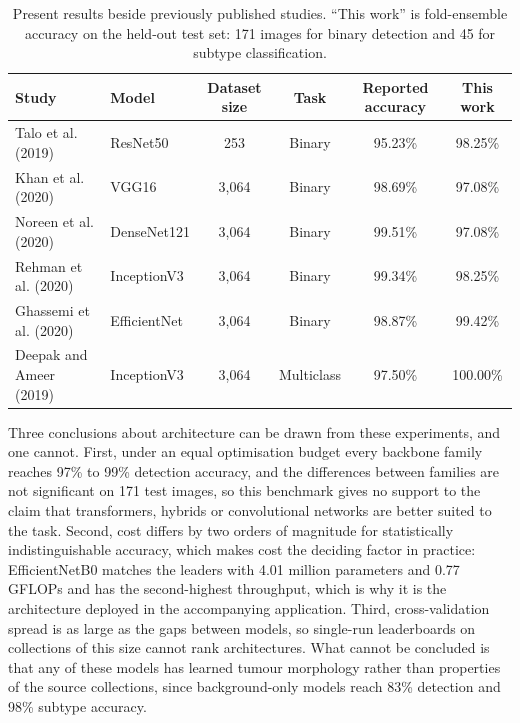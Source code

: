 \documentclass[final,3p,times,number]{elsarticle}
\begin{document}
\begin{table}[htbp]
\centering
\caption{Present results beside previously published studies. ``This work'' is fold-ensemble accuracy on the held-out test set: 171 images for binary detection and 45 for subtype classification.}
\label{tab:literature-comparison}
\small
\begin{tabular*}{\textwidth}{@{\extracolsep{\fill}}llcccc@{}}
\toprule
Study & Model & Dataset size & Task & Reported accuracy & This work \\
\midrule
Talo et al. (2019) \cite{ref16} & ResNet50 & 253 & Binary & 95.23\% & 98.25\% \\
Khan et al. (2020) \cite{ref23} & VGG16 & 3,064 & Binary & 98.69\% & 97.08\% \\
Noreen et al. (2020) \cite{ref24} & DenseNet121 & 3,064 & Binary & 99.51\% & 97.08\% \\
Rehman et al. (2020) \cite{ref25} & InceptionV3 & 3,064 & Binary & 99.34\% & 98.25\% \\
Ghassemi et al. (2020) \cite{ref26} & EfficientNet & 3,064 & Binary & 98.87\% & 99.42\% \\
Deepak and Ameer (2019) \cite{ref15} & InceptionV3 & 3,064 & Multiclass & 97.50\% & 100.00\% \\
\bottomrule
\end{tabular*}
\end{table}

Three conclusions about architecture can be drawn from these experiments, and one cannot. First, under an equal optimisation budget every backbone family reaches 97\% to 99\% detection accuracy, and the differences between families are not significant on 171 test images, so this benchmark gives no support to the claim that transformers, hybrids or convolutional networks are better suited to the task. Second, cost differs by two orders of magnitude for statistically indistinguishable accuracy, which makes cost the deciding factor in practice: EfficientNetB0 matches the leaders with 4.01 million parameters and 0.77 GFLOPs and has the second-highest throughput, which is why it is the architecture deployed in the accompanying application. Third, cross-validation spread is as large as the gaps between models, so single-run leaderboards on collections of this size cannot rank architectures. What cannot be concluded is that any of these models has learned tumour morphology rather than properties of the source collections, since background-only models reach 83\% detection and 98\% subtype accuracy.
\end{document}
